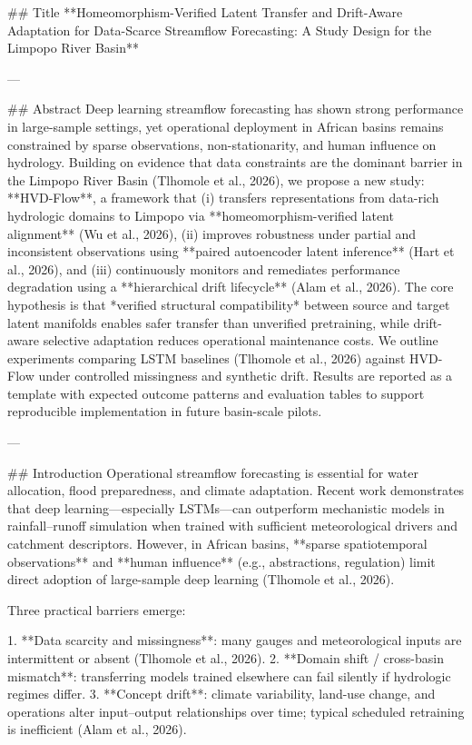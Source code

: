 ## Title  
**Homeomorphism-Verified Latent Transfer and Drift-Aware Adaptation for Data-Scarce Streamflow Forecasting: A Study Design for the Limpopo River Basin**

---

## Abstract  
Deep learning streamflow forecasting has shown strong performance in large-sample settings, yet operational deployment in African basins remains constrained by sparse observations, non-stationarity, and human influence on hydrology. Building on evidence that data constraints are the dominant barrier in the Limpopo River Basin (Tlhomole et al., 2026), we propose a new study: **HVD-Flow**, a framework that (i) transfers representations from data-rich hydrologic domains to Limpopo via **homeomorphism-verified latent alignment** (Wu et al., 2026), (ii) improves robustness under partial and inconsistent observations using **paired autoencoder latent inference** (Hart et al., 2026), and (iii) continuously monitors and remediates performance degradation using a **hierarchical drift lifecycle** (Alam et al., 2026). The core hypothesis is that *verified structural compatibility* between source and target latent manifolds enables safer transfer than unverified pretraining, while drift-aware selective adaptation reduces operational maintenance costs. We outline experiments comparing LSTM baselines (Tlhomole et al., 2026) against HVD-Flow under controlled missingness and synthetic drift. Results are reported as a template with expected outcome patterns and evaluation tables to support reproducible implementation in future basin-scale pilots.

---

## Introduction  
Operational streamflow forecasting is essential for water allocation, flood preparedness, and climate adaptation. Recent work demonstrates that deep learning—especially LSTMs—can outperform mechanistic models in rainfall–runoff simulation when trained with sufficient meteorological drivers and catchment descriptors. However, in African basins, **sparse spatiotemporal observations** and **human influence** (e.g., abstractions, regulation) limit direct adoption of large-sample deep learning (Tlhomole et al., 2026).

Three practical barriers emerge:

1. **Data scarcity and missingness**: many gauges and meteorological inputs are intermittent or absent (Tlhomole et al., 2026).  
2. **Domain shift / cross-basin mismatch**: transferring models trained elsewhere can fail silently if hydrologic regimes differ.  
3. **Concept drift**: climate variability, land-use change, and operations alter input–output relationships over time; typical scheduled retraining is inefficient (Alam et al., 2026).

